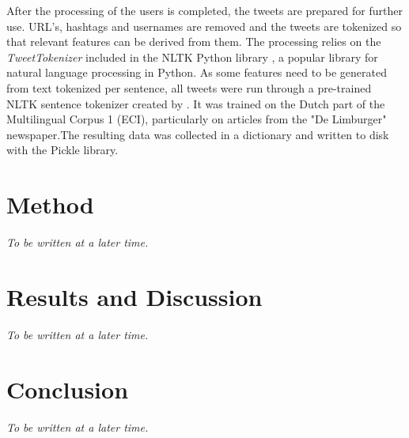 \documentclass[
10pt, %
a4paper, %
oneside, %
headinclude,footinclude, %
] {book}%
\begin{document}
After the processing of the users is completed, the tweets are prepared for further use. URL's, hashtags and usernames are removed and the tweets are tokenized so that relevant features can be derived from them. The processing relies on the \textit{TweetTokenizer} included in the NLTK Python library \citep{nltk}, a popular library for natural language processing in Python. As some features need to be generated from text tokenized per sentence, all tweets were run through a pre-trained NLTK sentence tokenizer created by \citet{punkt}. It was trained on the Dutch part of the Multilingual Corpus 1 (ECI), particularly on articles from the "De Limburger" newspaper.The resulting data was collected in a dictionary and written to disk with the Pickle library.

\chapter{Method}

\textit{To be written at a later time.}


\chapter{Results and Discussion}

\textit{To be written at a later time.}


\chapter{Conclusion}

\textit{To be written at a later time.}



 

\end{document}
